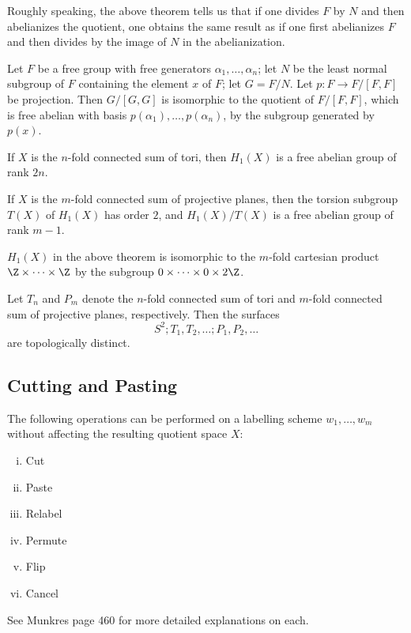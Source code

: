 \begin{remark}
Roughly speaking, the above theorem tells us that if one divides $F$ by $N$ and then abelianizes the quotient, one obtains
the same result as if one first abelianizes $F$ and then divides by the image of $N$ in the abelianization.
\end{remark}

\begin{corollary}
Let $F$ be a free group with free generators $\alpha_1, \dots, \alpha_n$; let $N$ be the least normal subgroup of $F$ containing the element $x$ of $F$; let $G = F / N$.
Let $p\colon F \rightarrow F / [F, F]$ be projection. Then $G/[G, G]$ is isomorphic to the quotient of $F/[F, F]$, which is free abelian with basis
$p(\alpha_1), \dots, p(\alpha_n)$, by the subgroup generated by $p(x)$.
\end{corollary}

\begin{theorem}
If $X$ is the $n$-fold connected sum of tori, then $H_1(X)$ is a free abelian group of rank $2n$.
\end{theorem}

\begin{theorem}
If $X$ is the $m$-fold connected sum of projective planes, then the torsion subgroup $T(X)$ of $H_1(X)$ has order $2$, and
$H_1(X) / T(X)$ is a free abelian group of rank $m-1$.
\end{theorem}
\begin{remark}
$H_1(X)$ in the above theorem is isomorphic to the $m$-fold cartesian product $\Z \times \dots \times \Z$ by the subgroup $0 \times \dots \times 0 \times 2\Z$. 
\end{remark}

\begin{theorem}
Let $T_n$ and $P_m$ denote the $n$-fold connected sum of tori and $m$-fold connected sum of projective planes, respectively.
Then the surfaces
\[
    S^2; T_1, T_2, \dots ; P_1, P_2, \dots
\]
are topologically distinct.
\end{theorem}

\subsection{Cutting and Pasting}

\begin{theorem}
The following operations can be performed on a labelling scheme $w_1, \dots, w_m$ without affecting the resulting quotient space $X$:
\begin{enumerate}[i)]
    \item Cut
    \item Paste
    \item Relabel
    \item Permute
    \item Flip
    \item Cancel
\end{enumerate}
See Munkres page 460 for more detailed explanations on each.
\end{theorem}


